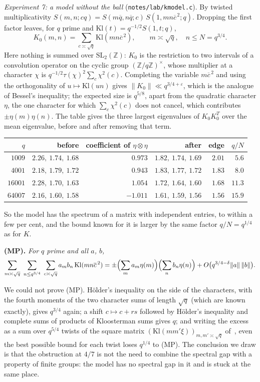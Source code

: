 \documentclass[11pt]{amsart}
\theoremstyle{definition}
\theoremstyle{remark}
\numberwithin{equation}{section}
\newcommand{\Z}{\mathbb Z}
\newcommand{\eps}{\varepsilon}
\newcommand{\inv}[1]{\overline{#1}}
\begin{document}
\emph{Experiment 7: a model without the ball}
(\texttt{notes/lab/kmodel.c}).  By twisted multiplicativity
$S(m,n;cq)=S(m\inv q,n\inv q;c)\,S(1,mn\inv c^{\,2};q)$.  Dropping the first
factor leaves, for $q$ prime and $\mathrm{Kl}(t)=q^{-1/2}S(1,t;q)$,
\[
 K_0(m,n)=\sum_{c\asymp\sqrt q}\mathrm{Kl}(mn\inv c^{\,2}),\qquad
 m\asymp\sqrt q,\quad n\le N=q^{3/4}.
\]
Here nothing is summed over $\mathrm{SL}_2(\Z)$: $K_0$ is the restriction to
two intervals of a convolution operator on the cyclic group
$(\Z/q\Z)^{\times}$, whose multiplier at a character $\chi$ is
$q^{-1/2}\tau(\chi)^2\sum_c\chi^2(c)$.  Completing the variable $m\inv c^{\,2}$
and using the orthogonality of $u\mapsto\mathrm{Kl}(un)$ gives
$\|K_0\|\ll q^{3/4+\eps}$, which is the analogue of Bessel's inequality; the
expected size is $q^{5/8}$, apart from the quadratic character $\eta$, the
one character for which $\sum_c\chi^2(c)$ does not cancel, which contributes
$\pm\eta(m)\eta(n)$.  The table gives the three largest eigenvalues of
$K_0K_0^{T}$ over the mean eigenvalue, before and after removing that term.

\medskip
\begin{center}
\begin{tabular}{rrrrrr}
$q$ & before & coefficient of $\eta\otimes\eta$ & after & edge & $q/N$\\ \hline
$1009$ & $2.26,\ 1.74,\ 1.68$ & $0.973$ & $1.82,\ 1.74,\ 1.69$ & $2.01$ & $5.6$\\
$4001$ & $2.18,\ 1.79,\ 1.72$ & $0.943$ & $1.83,\ 1.77,\ 1.72$ & $1.83$ & $8.0$\\
$16001$ & $2.28,\ 1.70,\ 1.63$ & $1.054$ & $1.72,\ 1.64,\ 1.60$ & $1.68$ & $11.3$\\
$64007$ & $2.16,\ 1.60,\ 1.58$ & $-1.011$ & $1.61,\ 1.59,\ 1.56$ & $1.56$ & $15.9$
\end{tabular}
\end{center}
\medskip

So the model has the spectrum of a matrix with independent entries, to
within a few per cent, and the bound known for it is larger by the same
factor $q/N=q^{1/4}$ as for $K$.

\medskip\noindent\textbf{(MP).}  \emph{For $q$ prime and all $a$, $b$,
\[
 \sum_{m\asymp\sqrt q}\ \sum_{n\le q^{3/4}}\ \sum_{c\asymp\sqrt q}
 a_mb_n\,\mathrm{Kl}(mn\inv c^{\,2})
 =\pm\Bigl(\sum_ma_m\eta(m)\Bigr)\Bigl(\sum_nb_n\eta(n)\Bigr)
 +O\bigl(q^{3/4-\delta}\|a\|\,\|b\|\bigr).
\]}

\medskip
We could not prove (MP).  H\"older's inequality on the side of the
characters, with the fourth moments of the two character sums of length
$\sqrt q$ (which are known exactly), gives $q^{3/4}$ again; a shift
$c\mapsto c+rs$ followed by H\"older's inequality and complete sums of
products of Kloosterman sums gives $q$; and writing the excess as a sum over
$q^{5/4}$ twists of the square matrix
$(\mathrm{Kl}(mm'\xi))_{m,m'\asymp\sqrt q}$ of~\cite{KMS,Pas25b}, even the
best possible bound for each twist loses $q^{1/4}$ to (MP).  The conclusion
we draw is that the obstruction at $4/7$ is not the need to combine the
spectral gap with a property of finite groups: the model has no spectral
gap in it and is stuck at the same place.
\end{document}

